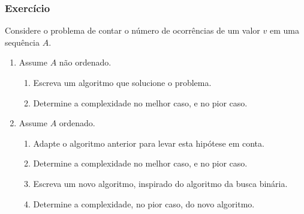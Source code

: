 \documentclass{beamer}
\begin{document}
\begin{frame}

\frametitle{Exercício}

Considere o problema de contar o número de ocorrências de um valor $v$ em uma sequência $A$.

\begin{enumerate}

\item Assume $A$ não ordenado. 
\begin{enumerate}
\item Escreva um algoritmo que solucione o problema. 
\item Determine a complexidade no melhor caso, e no pior caso.
\end{enumerate}
\item Assume $A$ ordenado.
\begin{enumerate}
\item Adapte o algoritmo anterior para levar esta hipótese em conta.
\item Determine a complexidade no melhor caso, e no pior caso.
\item Escreva um novo algoritmo, inspirado do algoritmo da busca binária.
\item Determine a complexidade, no pior caso, do novo algoritmo.
\end{enumerate}
\end{enumerate}


\end{frame}
\end{document}
